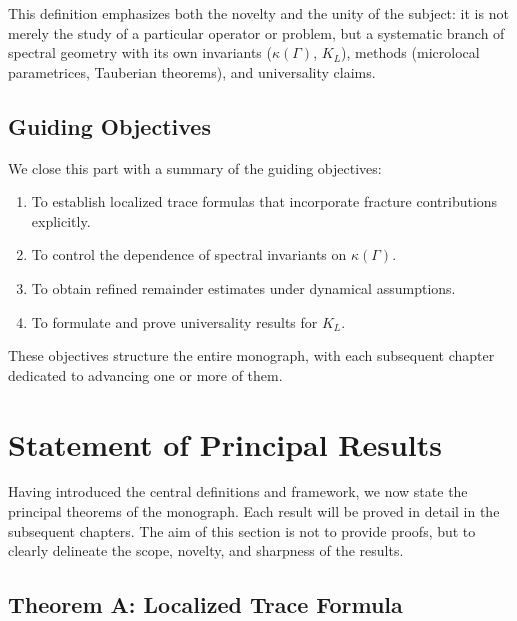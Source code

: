 This definition emphasizes both the novelty and the unity of the subject: it 
is not merely the study of a particular operator or problem, but a systematic 
branch of spectral geometry with its own invariants ($\kappa(\Gamma)$, $K_L$), 
methods (microlocal parametrices, Tauberian theorems), and universality claims.

\subsection{Guiding Objectives}

We close this part with a summary of the guiding objectives:

\begin{enumerate}
  \item To establish localized trace formulas that incorporate fracture 
  contributions explicitly.
  \item To control the dependence of spectral invariants on $\kappa(\Gamma)$.
  \item To obtain refined remainder estimates under dynamical assumptions.
  \item To formulate and prove universality results for $K_L$.
\end{enumerate}

These objectives structure the entire monograph, with each subsequent chapter 
dedicated to advancing one or more of them.


\section{Statement of Principal Results}

Having introduced the central definitions and framework, we now state the 
principal theorems of the monograph. Each result will be proved in detail 
in the subsequent chapters. The aim of this section is not to provide proofs, 
but to clearly delineate the scope, novelty, and sharpness of the results.

\subsection{Theorem A: Localized Trace Formula}

